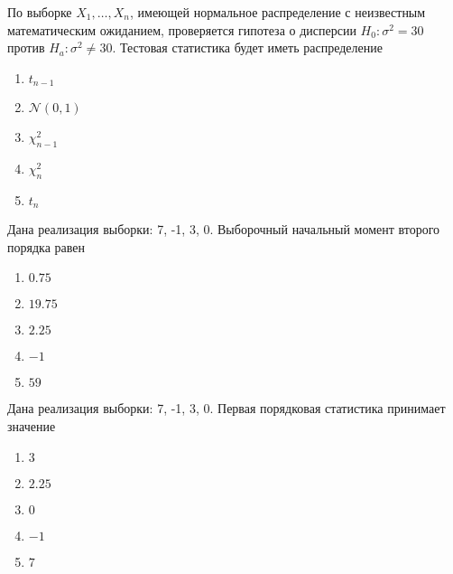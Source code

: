 \documentclass[t]{beamer}
\newcommand{\cN}{\mathcal{N}}
\begin{document}
 \begin{frame} \label{42} 
\begin{block}{42} 

По выборке $X_1,\ldots,X_{n}$, имеющей нормальное распределение с неизвестным математическим ожиданием, проверяется гипотеза о дисперсии $H_0: \sigma^2 = 30$ против $H_a: \sigma^2 \ne 30$. Тестовая статистика будет иметь распределение


 \end{block} 
\begin{enumerate} 
\item[] \hyperlink{42-No}{\beamergotobutton{} $t_{n-1}$}
\item[] \hyperlink{42-No}{\beamergotobutton{} $\cN(0,1)$}
\item[] \hyperlink{42-Yes}{\beamergotobutton{} $\chi^2_{n-1}$}
\item[] \hyperlink{42-No}{\beamergotobutton{} $\chi^2_n$}
\item[] \hyperlink{42-No}{\beamergotobutton{} $t_n$}
\end{enumerate} 
\end{frame} 


 \begin{frame} \label{43} 
\begin{block}{43} 

Дана реализация выборки: 7, -1, 3, 0. Выборочный начальный момент второго порядка равен


 \end{block} 
\begin{enumerate} 
\item[] \hyperlink{43-No}{\beamergotobutton{} $0.75$}
\item[] \hyperlink{43-Yes}{\beamergotobutton{} $19.75$}
\item[] \hyperlink{43-No}{\beamergotobutton{} $2.25$}
\item[] \hyperlink{43-No}{\beamergotobutton{} $-1$}
\item[] \hyperlink{43-No}{\beamergotobutton{} $59$}
\end{enumerate} 
\end{frame} 


 \begin{frame} \label{44} 
\begin{block}{44} 

Дана реализация выборки: 7, -1, 3, 0. Первая порядковая статистика принимает значение


 \end{block} 
\begin{enumerate} 
\item[] \hyperlink{44-No}{\beamergotobutton{} $3$}
\item[] \hyperlink{44-No}{\beamergotobutton{} $2.25$}
\item[] \hyperlink{44-No}{\beamergotobutton{} $0$}
\item[] \hyperlink{44-Yes}{\beamergotobutton{} $-1$}
\item[] \hyperlink{44-No}{\beamergotobutton{} $7$}
\end{enumerate} 
\end{frame} 
\end{document}
